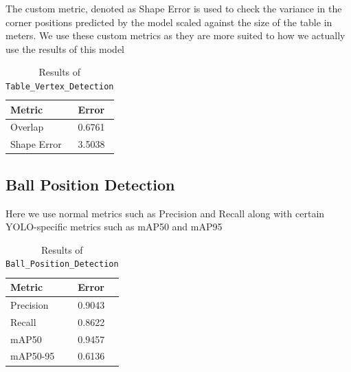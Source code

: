 \documentclass[conference]{IEEEtran}
\begin{document}
The custom metric, denoted as Shape Error is used to check the variance in the corner positions predicted by the model scaled against the size of the table in meters. We use these custom metrics as they are more suited to how we actually use the results of this model

\begin{table}[ht]
    \centering
    \caption{Results of  \texttt{Table\_Vertex\_Detection}}
    \label{tab:ttanalysis}
    \begin{tabular}{|l|l|}
        \hline
        \textbf{Metric}        & \textbf{Error}    \\
        \hline
        Overlap                &  0.6761           \\
        Shape Error                & 3.5038          \\
        \hline
    \end{tabular}
\end{table}

\subsection{Ball Position Detection}

Here we use normal metrics such as Precision and Recall along with certain YOLO-specific metrics such as mAP50 and mAP95

\begin{table}[ht]
    \centering
    \caption{Results of  \texttt{Ball\_Position\_Detection}}
    \label{tab:ttanalysis}
    \begin{tabular}{|l|l|}
        \hline
        \textbf{Metric}        & \textbf{Error}    \\
        \hline
        Precision                &  0.9043           \\
        Recall                & 0.8622          \\
        mAP50                & 0.9457          \\
        mAP50-95                & 0.6136          \\
        
        \hline
    \end{tabular}
\end{table}

\end{document}
